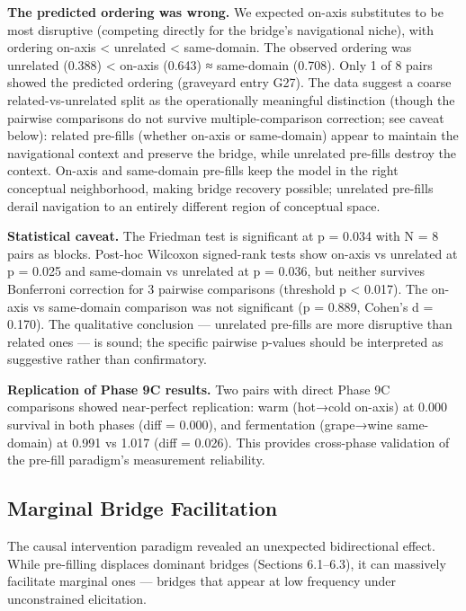 \textbf{The predicted ordering was wrong.} We expected on-axis substitutes to be most disruptive (competing directly for the bridge's navigational niche), with ordering on-axis \textless{} unrelated \textless{} same-domain. The observed ordering was unrelated (0.388) \textless{} on-axis (0.643) ≈ same-domain (0.708). Only 1 of 8 pairs showed the predicted ordering (graveyard entry G27). The data suggest a coarse related-vs-unrelated split as the operationally meaningful distinction (though the pairwise comparisons do not survive multiple-comparison correction; see caveat below): related pre-fills (whether on-axis or same-domain) appear to maintain the navigational context and preserve the bridge, while unrelated pre-fills destroy the context. On-axis and same-domain pre-fills keep the model in the right conceptual neighborhood, making bridge recovery possible; unrelated pre-fills derail navigation to an entirely different region of conceptual space.

\textbf{Statistical caveat.} The Friedman test is significant at p = 0.034 with N = 8 pairs as blocks. Post-hoc Wilcoxon signed-rank tests show on-axis vs unrelated at p = 0.025 and same-domain vs unrelated at p = 0.036, but neither survives Bonferroni correction for 3 pairwise comparisons (threshold p \textless{} 0.017). The on-axis vs same-domain comparison was not significant (p = 0.889, Cohen's d = 0.170). The qualitative conclusion --- unrelated pre-fills are more disruptive than related ones --- is sound; the specific pairwise p-values should be interpreted as suggestive rather than confirmatory.

\textbf{Replication of Phase 9C results.} Two pairs with direct Phase 9C comparisons showed near-perfect replication: warm (hot→cold on-axis) at 0.000 survival in both phases (diff = 0.000), and fermentation (grape→wine same-domain) at 0.991 vs 1.017 (diff = 0.026). This provides cross-phase validation of the pre-fill paradigm's measurement reliability.

\subsection{Marginal Bridge Facilitation}\label{marginal-bridge-facilitation}

The causal intervention paradigm revealed an unexpected bidirectional effect. While pre-filling displaces dominant bridges (Sections 6.1--6.3), it can massively facilitate marginal ones --- bridges that appear at low frequency under unconstrained elicitation.

